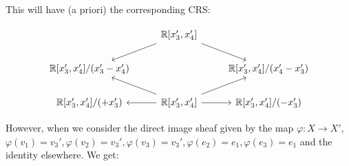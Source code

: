 \documentclass[12pt]{article}
\theoremstyle{definition}
\newcommand{\<}{\langle}
\renewcommand{\>}{\rangle}
\begin{document}
This will have (a priori) the corresponding CRS:

\[\begin{tikzcd}
	& {\mathbb{R}[x_3',x_4']} \\
	{\mathbb{R}[x_3',x_4'] / (x_3' - x_4')} && {\mathbb{R}[x_3',x_4'] / (x_4' - x_3')} \\
	{\mathbb{R}[x_3',x_4'] /(+x_3')} & {\mathbb{R}[x_3',x_4']} & {\mathbb{R}[x_3',x_4'] / (-x_3')}
	\arrow[from=1-2, to=2-1]
	\arrow[from=1-2, to=2-3]
	\arrow[from=3-2, to=2-1]
	\arrow[from=3-2, to=2-3]
	\arrow[from=3-2, to=3-1]
	\arrow[from=3-2, to=3-3]
\end{tikzcd}\]

However, when we consider the direct image sheaf given by the map 
$\varphi: X \to X'$, $\varphi(v_1) = v_3', \varphi(v_2) = v_3', \varphi(v_3) = v_3', \varphi(e_2) = e_1 , \varphi(e_3) = e_1$ and
the identity elsewhere. We get:
\end{document}
